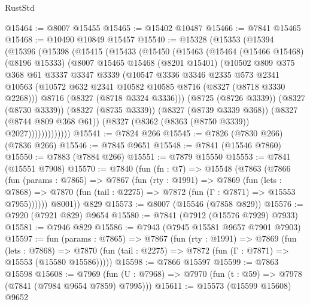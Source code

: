 \begin{lexlean}{RustStd}
\begin{coremodule}
@15464 := @8007 @15455
@15465 := @15402 @10487
@15466 := @7841 @15465
@15468 := @10490 @10849 @15457
@15540 := @15328
    (@15353
      (@15394
        (@15396
          (@15398
            (@15415
              (@15433
                (@15450
                  (@15463
                    (@15464
                      (@15466 @15468)
                      (@8196 @15333)
                      (@8007
                        @15465
                        @15468
                        (@8201 @15401)
                        (@10502
                          @809
                          @375
                          @368
                          @61
                          @3337
                          @3347
                          @3339
                          (@10547
                            @3336
                            @3346
                            @2335
                            @573
                            @2341
                            @10563
                            (@10572 @632 @2341 @10582 @10585 @8716 (@8327 (@8718 @3330 @2268)))
                            @8716
                            (@8327 (@8718 @3324 @3336)))
                          (@8725 (@8726 @3339))
                          (@8327 (@8730 @3339))
                          (@8327 (@8735 @3339))
                          (@8327 (@8739 @3339 @368))
                          (@8327 (@8744 @809 @368 @61))
                          (@8327 (@8362 (@8363 (@8750 @3339)) @2027)))))))))))))
@15541 := @7824 @266
@15545 := @7826 (@7830 @266) (@7836 @266)
@15546 := @7845 @9651
@15548 := @7841 (@15546 @7860)
@15550 := @7883 (@7884 @266)
@15551 := @7879 @15550
@15553 := @7841 (@15551 @7908)
@15570 := @7840
    (fun (fn : @7) =>
    @15548
      (@7863
        (@7866
          (fun (params : @7865) =>
          @7867
            (fun (rty : @1991) =>
            @7869
              (fun (lets : @7868) =>
              @7870 (fun (tail : @2275) => @7872 (fun (Γ : @7871) => @15553 @7955))))))
        @8001))
    @829
@15573 := @8007 (@15546 (@7858 @829))
@15576 := @7920 (@7921 @829) @9654
@15580 := @7841 (@7912 (@15576 @7929) @7933)
@15581 := @7946 @829
@15586 := @7943 (@7945 @15581 @9657 @7901 @7903)
@15597 := fun (params : @7865) =>
  @7867
    (fun (rty : @1991) =>
    @7869
      (fun (lets : @7868) =>
      @7870 (fun (tail : @2275) => @7872 (fun (Γ : @7871) => @15553 (@15580 @15586)))))
@15598 := @7866 @15597
@15599 := @7863 @15598
@15608 := @7969
    (fun (U : @7968) => @7970 (fun (t : @59) => @7978 (@7841 (@7984 @9654 @7859) @7995)))
@15611 := @15573 (@15599 @15608) @9652

\end{coremodule}
\end{lexlean}
